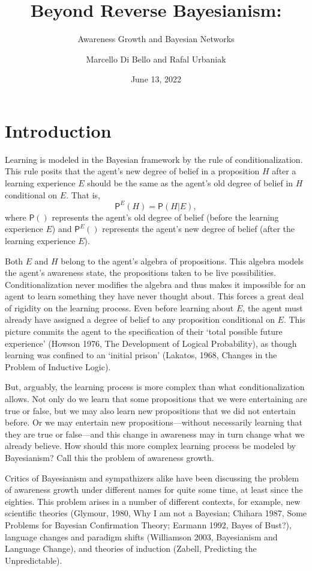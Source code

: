 \documentclass[
  11pt,
  dvipsnames,enabledeprecatedfontcommands]{scrartcl}
\title{Beyond Reverse Bayesianism:}
\subtitle{Awareness Growth and Bayesian Networks}
\author{Marcello Di Bello and Rafal Urbaniak}
\date{June 13, 2022}
\newcommand{\pr}[1]{\ensuremath{\mathsf{P}(#1)}}
\newcommand{\ppr}[2]{\ensuremath{\mathsf{P}^{#1}(#2)}}
\begin{document}
\maketitle

\hypertarget{introduction}{%
\section{Introduction}\label{introduction}}

Learning is modeled in the Bayesian framework by the rule of
conditionalization. This rule posits that the agent's new degree of
belief in a proposition \(H\) after a learning experience \(E\) should
be the same as the agent's old degree of belief in \(H\) conditional on
\(E\). That is, \[\ppr{E}{H}=\pr{H \vert E},\] where \(\pr{}\)
represents the agent's old degree of belief (before the learning
experience \(E\)) and \(\ppr{E}{}\) represents the agent's new degree of
belief (after the learning experience \(E\)).

Both \(E\) and \(H\) belong to the agent's algebra of propositions. This
algebra models the agent's awareness state, the propositions taken to be
live possibilities. Conditionalization never modifies the algebra and
thus makes it impossible for an agent to learn something they have never
thought about. This forces a great deal of rigidity on the learning
process. Even before learning about \(E\), the agent must already have
assigned a degree of belief to any proposition conditional on \(E\).
This picture commits the agent to the specification of their `total
possible future experience' (Howson 1976, The Development of Logical
Probability), as though learning was confined to an `initial prison'
(Lakatos, 1968, Changes in the Problem of Inductive Logic).

But, arguably, the learning process is more complex than what
conditionalization allows. Not only do we learn that some propositions
that we were entertaining are true or false, but we may also learn new
propositions that we did not entertain before. Or we may entertain new
propositions---without necessarily learning that they are true or
false---and this change in awareness may in turn change what we already
believe. How should this more complex learning process be modeled by
Bayesianism? Call this the problem of awareness growth.

Critics of Bayesianism and sympathizers alike have been discussing the
problem of awareness growth under different names for quite some time,
at least since the eighties. This problem arises in a number of
different contexts, for example, new scientific theories (Glymour, 1980,
Why I am not a Bayesian; Chihara 1987, Some Problems for Bayesian
Confirmation Theory; Earmann 1992, Bayes of Bust?), language changes and
paradigm shifts (Williamson 2003, Bayesianism and Language Change), and
theories of induction (Zabell, Predicting the Unpredictable).
\end{document}
